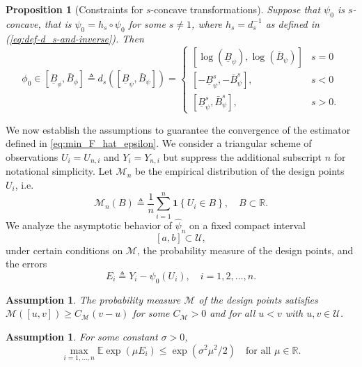 \documentclass{article} %
\def\eqref#1{equation~\ref{#1}}
\renewcommand{\eqref}[1]{(\ref{#1})}
\newtheorem{assumption}[theorem]{Assumption}
\newtheorem{proposition}[theorem]{Proposition}
\begin{document}
\begin{proposition}[Constraints for \ensuremath{s}-concave transformations]\label{prop:s-concave-constraits}
Suppose that $\psi_0$ is $s$-concave, that is $\psi_0 = h_s \circ \psi_0$ for some $s\neq 1$, where $h_s = d_s^{-1}$ as defined in \eqref{eq:def-d_s-and-inverse}. Then 
$$
\phi_0 \in [\underline{B}_{\phi},\bar{B}_{\phi}] \triangleq d_s([\underline{B}_{\psi},\bar{B}_{\psi}])= \begin{cases}[\log (\underline{B}_{\psi}),\log(\bar{B}_{\psi})] & s=0 \\ [-\underline{B}_{\psi}^s,-\bar{B}_{\psi}^s], & s<0 \\ [\underline{B}_{\psi}^s,\bar{B}_{\psi}^s], & s>0.\end{cases}
$$
\end{proposition}
We now establish the assumptions to guarantee the convergence of the estimator defined in \cref{eq:min_F_hat_epsilon}. We consider a triangular scheme of observations $U_i=U_{n, i}$ and $Y_i=Y_{n, i}$ but suppress the additional subscript $n$ for notational simplicity. Let $\mathscr{M}_n$ be the empirical distribution of the design points $U_i$, i.e. 
$$
\mathscr{M}_n(B)\triangleq \frac{1}{n} \sum_{i=1}^n \mathbf{1}\left\{U_i \in B\right\}, \quad B \subset \mathbb{R}.
$$ 
We analyze the asymptotic behavior of $\widehat{\psi}_n$ on a fixed compact interval 
$$
[a, b] \subset \mathcal{U},
$$ under certain conditions on $\mathscr{M}$, the probability measure of the design points, and the errors
$$
E_i \triangleq Y_i-\psi_0\left(U_i\right), \quad i = 1,2, \dots, n.
$$
\begin{assumption}\label{Assumption_1:d-concave}
The probability measure $\mathscr{M}$ of the design points satisfies $\mathscr{M}([u,v])\geq C_{\mathscr{M}} (v-u)$ for some $C_{\mathscr{M}}>0$ and for all $u<v$ with $u,v \in \mathcal{U}$.
\end{assumption}

\begin{assumption}\label{Assumption_3:subgaussian-errors}
For some constant $\sigma>0$,
$$
\max _{i=1 ,\dots , n} \mathbb{E} \exp \left(\mu E_i\right) \leq \exp \left(\sigma^2 \mu^2 / 2\right) \quad \text{for all }\mu \in \mathbb{R}.
$$
\end{assumption}
\end{document}
